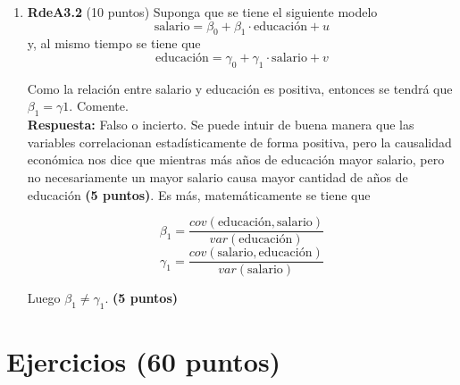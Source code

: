 \documentclass[10pt,a4paper]{article}
\begin{document}
\begin{enumerate}
\begin{enumerate}
- \(\displaystyle \sum_{i=1}^n (\hat{Y}_i - \bar{Y})^2\): \textit{Suma de cuadrados explicada} (SSR), mide la variabilidad de los valores predichos por el modelo respecto a la media, es decir, la parte de la variabilidad que el modelo logra explicar.

- \(\displaystyle \sum_{i=1}^n {u}_i^2\): \textit{Suma de cuadrados de residuos} (SSE), representa la variabilidad no explicada por el modelo, es decir, la variabilidad de los  residuos.
\end{enumerate}

    \item \textbf{RdeA3.2} (10 puntos) Suponga que se tiene el siguiente modelo 
    $$\text{salario} = \beta_0 + \beta_1 \cdot \text{educación}  + u$$
    y, al mismo tiempo se tiene que 
    $$\text{educación} = \gamma_0 + \gamma_1 \cdot \text{salario} + v$$
    
    Como la relación entre salario y educación es positiva, entonces se tendrá que $\beta_1 = \gamma1$. Comente.\\

\textbf{Respuesta:} Falso o incierto. Se puede intuir de buena manera que las variables correlacionan estadísticamente de forma positiva, pero la causalidad económica nos dice que mientras más años de educación mayor salario, pero no necesariamente un mayor salario causa mayor cantidad de años de educación \textbf{(5 puntos)}. Es más, matemáticamente se tiene que

$$\beta_1 = \frac{cov(\text{educación}, \text{salario})}{var(\text{educación})}$$
$$\gamma_1 = \frac{cov(\text{salario}, \text{educación})}{var(\text{salario})}$$

Luego $\beta_1 \neq \gamma_1$. \textbf{(5 puntos)}



\end{enumerate}

\section{Ejercicios (60 puntos)}
\end{document}
